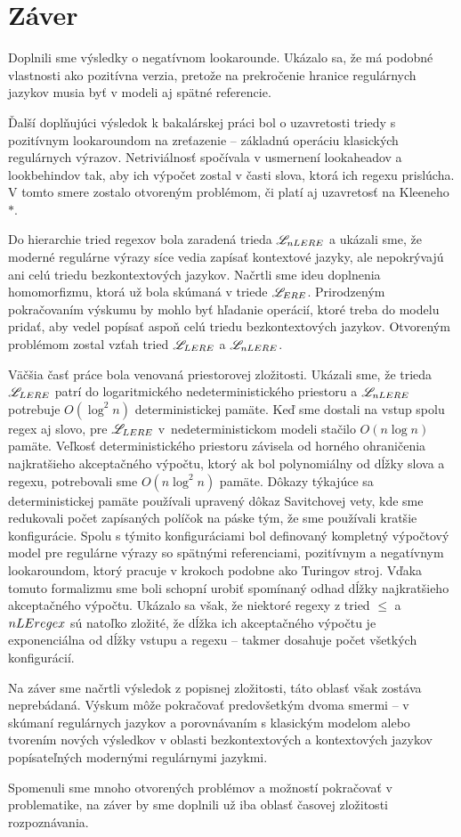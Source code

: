 \chapter*{Záver}
\label{chap:zaver}
{}

Doplnili sme výsledky o negatívnom lookarounde. Ukázalo sa, že má podobné vlastnosti ako pozitívna verzia, pretože na prekročenie hranice regulárnych jazykov musia byť v modeli aj spätné referencie.

Ďalší doplňujúci výsledok k bakalárskej práci bol o uzavretosti triedy s pozitívnym lookaroundom na zreťazenie -- základnú operáciu klasických regulárnych výrazov. Netriviálnosť spočívala v usmernení lookaheadov a lookbehindov tak, aby ich výpočet zostal v časti slova, ktorá ich regexu prislúcha. V tomto smere zostalo otvoreným problémom, či platí aj uzavretosť na Kleeneho $*$.

Do hierarchie tried regexov bola zaradená trieda $\mathscr{L}_{nLERE}$ a ukázali sme, že moderné regulárne výrazy síce vedia zapísať kontextové jazyky, ale nepokrývajú ani celú triedu bezkontextových jazykov. Načrtli sme ideu doplnenia homomorfizmu, ktorá už bola skúmaná v triede $\mathscr{L}_{ERE}$. Prirodzeným pokračovaním výskumu by mohlo byť hľadanie operácií, ktoré treba do modelu pridať, aby vedel popísať aspoň celú triedu bezkontextových jazykov. Otvoreným problémom zostal vzťah tried $\mathscr{L}_{LERE}$ a $\mathscr{L}_{nLERE}$.

Väčšia časť práce bola venovaná priestorovej zložitosti. Ukázali sme, že trieda $\mathscr{L}_{LERE}$ patrí do logaritmického nedeterministického priestoru a $\mathscr{L}_{nLERE}$ potrebuje $O(\log ^2 n)$ deterministickej pamäte. Keď sme dostali na vstup spolu regex aj slovo, pre $\mathscr{L}_{LERE}$ v~nedeterministickom modeli stačilo $O(n\log n)$ pamäte. Veľkosť deterministického priestoru závisela od horného ohraničenia najkratšieho akceptačného výpočtu, ktorý ak bol polynomiálny od dĺžky slova a regexu, potrebovali sme $O(n\log^2 n)$ pamäte. Dôkazy týkajúce sa deterministickej pamäte používali upravený dôkaz Savitchovej vety, kde sme redukovali počet zapísaných políčok na páske tým, že sme používali kratšie konfigurácie. Spolu s týmito konfiguráciami bol definovaný kompletný výpočtový model pre regulárne výrazy so spätnými referenciami, pozitívnym a negatívnym lookaroundom, ktorý pracuje v krokoch podobne ako Turingov stroj. Vďaka tomuto formalizmu sme boli schopní urobiť spomínaný odhad dĺžky najkratšieho akceptačného výpočtu. Ukázalo sa však, že niektoré regexy z tried $\le$ a $nLEregex$ sú natoľko zložité, že dĺžka ich akceptačného výpočtu je exponenciálna od dĺžky vstupu a regexu -- takmer dosahuje počet všetkých konfigurácií.

Na záver sme načrtli výsledok z popisnej zložitosti, táto oblasť však zostáva neprebádaná. Výskum môže pokračovať predovšetkým dvoma smermi -- v skúmaní regulárnych jazykov a porovnávaním s klasickým modelom alebo tvorením nových výsledkov v oblasti bezkontextových a kontextových jazykov popísateľných modernými regulárnymi jazykmi.

Spomenuli sme mnoho otvorených problémov a možností pokračovať v problematike, na záver by sme doplnili už iba oblasť časovej zložitosti rozpoznávania.